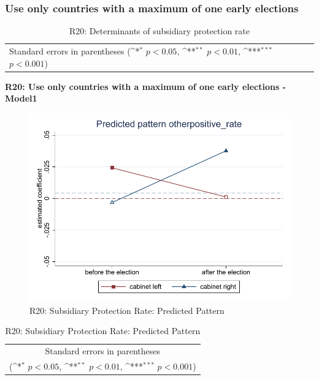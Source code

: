 \documentclass[10pt,a4paper]{scrartcl}
\begin{document}


\clearpage
\FloatBarrier
\subsubsection{Use only countries with a maximum of one early elections}
\begin{table}[!ht]\centering
	\renewcommand{\arraystretch}{1.25}
	\small
	\def\sym#1{\ifmmode^{#1}\else\(^{#1}\)\fi}
	\caption{R20: Determinants of subsidiary protection rate}
	\begin{tabular}{l*{3}{c}}
		\hline\hline
		
		\hline\hline
		\multicolumn{4}{l}{\footnotesize Standard errors in parentheses (\sym{*} \(p<0.05\), \sym{**} \(p<0.01\), \sym{***} \(p<0.001\))}\\
	\end{tabular}
\end{table}

\clearpage
\textbf{R20: Use only countries with a maximum of one early elections - Model1}
\begin{figure}[!ht]
	\centering
	\includegraphics[width=1\textwidth]{figures_edited/otherpositive_rate_graph1_R20.pdf}
	\caption{R20: Subsidiary Protection Rate: Predicted Pattern}
\end{figure}

\begin{table}[!ht]\centering
	\renewcommand{\arraystretch}{1.25}
	\def\sym#1{\ifmmode^{#1}\else\(^{#1}\)\fi}
	\caption{R20: Subsidiary Protection Rate: Predicted Pattern}
	\begin{tabular}{l*{2}{c}}
		\hline\hline
		
		\hline\hline
		\multicolumn{3}{c}{\footnotesize Standard errors in parentheses} \\
		\multicolumn{3}{c}{\footnotesize (\sym{*} \(p<0.05\), \sym{**} \(p<0.01\), \sym{***} \(p<0.001\))}\\
	\end{tabular}
\end{table}
\end{document}

